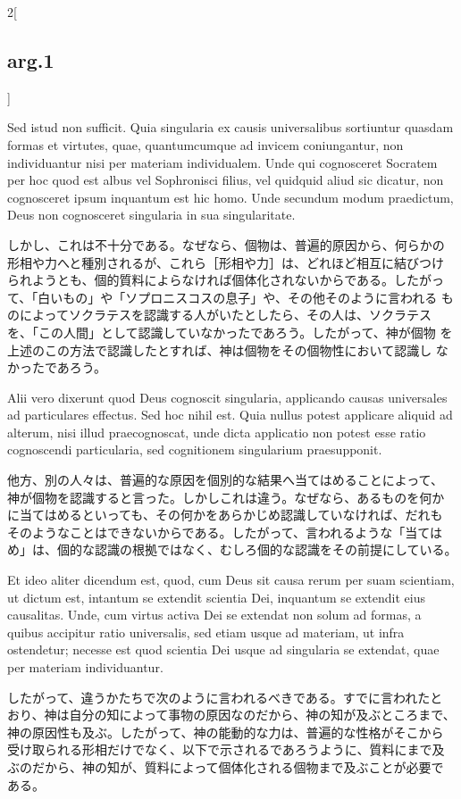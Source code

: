 \documentclass[paper=a4paper,fontsize=10pt,jafontsize=9pt,titlepage]{jlreq}
\begin{document}
\begin{paracol}{2}[\subsection{arg.1}]
\switchcolumn*

Sed istud non sufficit. Quia singularia ex causis universalibus
sortiuntur quasdam formas et virtutes, quae, quantumcumque ad invicem
coniungantur, non individuantur nisi per materiam individualem. Unde
qui cognosceret Socratem per hoc quod est albus vel Sophronisci
filius, vel quidquid aliud sic dicatur, non cognosceret ipsum
inquantum est hic homo. Unde secundum modum praedictum, Deus non
cognosceret singularia in sua singularitate.

\switchcolumn

しかし、これは不十分である。なぜなら、個物は、普遍的原因から、何らかの
形相や力へと種別されるが、これら［形相や力］は、どれほど相互に結びつけ
られようとも、個的質料によらなければ個体化されないからである。したがっ
て、「白いもの」や「ソプロニスコスの息子」や、その他そのように言われる
ものによってソクラテスを認識する人がいたとしたら、その人は、ソクラテス
を、「この人間」として認識していなかったであろう。したがって、神が個物
を上述のこの方法で認識したとすれば、神は個物をその個物性において認識し
なかったであろう。

\switchcolumn*

Alii vero dixerunt quod Deus cognoscit singularia, applicando causas
universales ad particulares effectus. Sed hoc nihil est. Quia nullus
potest applicare aliquid ad alterum, nisi illud praecognoscat, unde
dicta applicatio non potest esse ratio cognoscendi particularia, sed
cognitionem singularium praesupponit.

\switchcolumn

他方、別の人々は、普遍的な原因を個別的な結果へ当てはめることによって、
神が個物を認識すると言った。しかしこれは違う。なぜなら、あるものを何か
に当てはめるといっても、その何かをあらかじめ認識していなければ、だれも
そのようなことはできないからである。したがって、言われるような「当ては
め」は、個的な認識の根拠ではなく、むしろ個的な認識をその前提にしている。

\switchcolumn*

Et ideo aliter dicendum est, quod, cum Deus sit causa rerum per suam
scientiam, ut dictum est, intantum se extendit scientia Dei, inquantum
se extendit eius causalitas. Unde, cum virtus activa Dei se extendat
non solum ad formas, a quibus accipitur ratio universalis, sed etiam
usque ad materiam, ut infra ostendetur; necesse est quod scientia Dei
usque ad singularia se extendat, quae per materiam individuantur.

\switchcolumn

したがって、違うかたちで次のように言われるべきである。すでに言われたと
おり、神は自分の知によって事物の原因なのだから、神の知が及ぶところまで、
神の原因性も及ぶ。したがって、神の能動的な力は、普遍的な性格がそこから
受け取られる形相だけでなく、以下で示されるであろうように、質料にまで及
ぶのだから、神の知が、質料によって個体化される個物まで及ぶことが必要で
ある。


\end{paracol}
\end{document}
